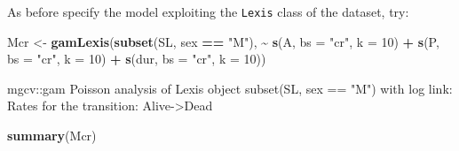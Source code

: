 \documentclass[
]{book}
\newenvironment{Shaded}{\begin{snugshade}}{\end{snugshade}}
\newcommand{\AttributeTok}[1]{\textcolor[rgb]{0.13,0.29,0.53}{#1}}
\newcommand{\DecValTok}[1]{\textcolor[rgb]{0.00,0.00,0.81}{#1}}
\newcommand{\FunctionTok}[1]{\textcolor[rgb]{0.13,0.29,0.53}{\textbf{#1}}}
\newcommand{\NormalTok}[1]{#1}
\newcommand{\OtherTok}[1]{\textcolor[rgb]{0.56,0.35,0.01}{#1}}
\newcommand{\SpecialCharTok}[1]{\textcolor[rgb]{0.81,0.36,0.00}{\textbf{#1}}}
\newcommand{\StringTok}[1]{\textcolor[rgb]{0.31,0.60,0.02}{#1}}
\begin{document}
\begin{enumerate}
  As before specify the model exploiting the \texttt{Lexis} class of the dataset, try:

\begin{Shaded}
\begin{Highlighting}[]
\NormalTok{Mcr }\OtherTok{\textless{}{-}} \FunctionTok{gamLexis}\NormalTok{(}\FunctionTok{subset}\NormalTok{(SL, sex }\SpecialCharTok{==} \StringTok{"M"}\NormalTok{),}
                 \SpecialCharTok{\textasciitilde{}} \FunctionTok{s}\NormalTok{(A, }\AttributeTok{bs =} \StringTok{"cr"}\NormalTok{, }\AttributeTok{k =} \DecValTok{10}\NormalTok{) }\SpecialCharTok{+}
                   \FunctionTok{s}\NormalTok{(P, }\AttributeTok{bs =} \StringTok{"cr"}\NormalTok{, }\AttributeTok{k =} \DecValTok{10}\NormalTok{) }\SpecialCharTok{+}
                 \FunctionTok{s}\NormalTok{(dur, }\AttributeTok{bs =} \StringTok{"cr"}\NormalTok{, }\AttributeTok{k =} \DecValTok{10}\NormalTok{))}
\end{Highlighting}
\end{Shaded}

\begin{Shaded}
\begin{Highlighting}[]
\NormalTok{mgcv::gam Poisson analysis of Lexis object subset(SL, sex == "M") with log link:}
\NormalTok{Rates for the transition:}
\NormalTok{Alive{-}\textgreater{}Dead}
\end{Highlighting}
\end{Shaded}

\begin{Shaded}
\begin{Highlighting}[]
\FunctionTok{summary}\NormalTok{(Mcr)}
\end{Highlighting}
\end{Shaded}

\begin{Shaded}
\end{Shaded}
\end{enumerate}
\end{document}
